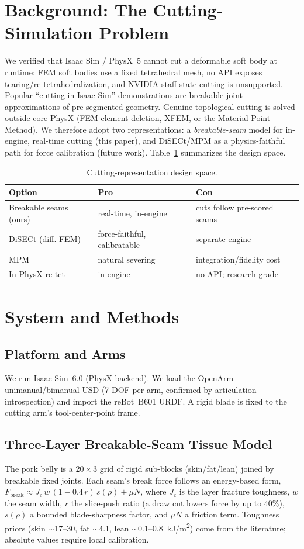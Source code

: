 \documentclass[conference]{IEEEtran}
\begin{document}
\section{Background: The Cutting-Simulation Problem}
\label{sec:bg}
We verified that Isaac Sim / PhysX~5 cannot cut a deformable soft body at runtime: FEM soft bodies use
a fixed tetrahedral mesh, no API exposes tearing/re-tetrahedralization, and NVIDIA staff state cutting
is unsupported. Popular ``cutting in Isaac Sim'' demonstrations are breakable-joint approximations of
pre-segmented geometry. Genuine topological cutting is solved outside core PhysX (FEM element deletion,
XFEM, or the Material Point Method). We therefore adopt two representations: a \emph{breakable-seam}
model for in-engine, real-time cutting (this paper), and DiSECt/MPM as a physics-faithful path for
force calibration (future work). Table~\ref{tab:design} summarizes the design space.

\begin{table}[t]\centering\small
\caption{Cutting-representation design space.}\label{tab:design}
\begin{tabular}{@{}lll@{}}\toprule
Option & Pro & Con \\ \midrule
Breakable seams (ours) & real-time, in-engine & cuts follow pre-scored seams \\
DiSECt (diff. FEM) & force-faithful, calibratable & separate engine \\
MPM & natural severing & integration/fidelity cost \\
In-PhysX re-tet & in-engine & no API; research-grade \\ \bottomrule
\end{tabular}
\end{table}

\section{System and Methods}
\label{sec:system}
\subsection{Platform and Arms}
We run Isaac Sim~6.0 (PhysX backend). We load the OpenArm unimanual/bimanual USD (7-DOF per arm,
confirmed by articulation introspection) and import the reBot~B601 URDF. A rigid blade is fixed to the
cutting arm's tool-center-point frame.

\subsection{Three-Layer Breakable-Seam Tissue Model}
The pork belly is a $20\times3$ grid of rigid sub-blocks (skin/fat/lean) joined by breakable fixed
joints. Each seam's break force follows an energy-based form,
$F_{\text{break}} \approx J_c\,w\,(1-0.4\,r)\,s(\rho) + \mu N$,
where $J_c$ is the layer fracture toughness, $w$ the seam width, $r$ the slice-push ratio (a draw cut
lowers force by up to $40\%$), $s(\rho)$ a bounded blade-sharpness factor, and $\mu N$ a friction term.
Toughness priors (skin $\sim$17--30, fat $\sim$4.1, lean $\sim$0.1--0.8~kJ/m\textsuperscript{2}) come
from the literature; absolute values require local calibration.
\end{document}
